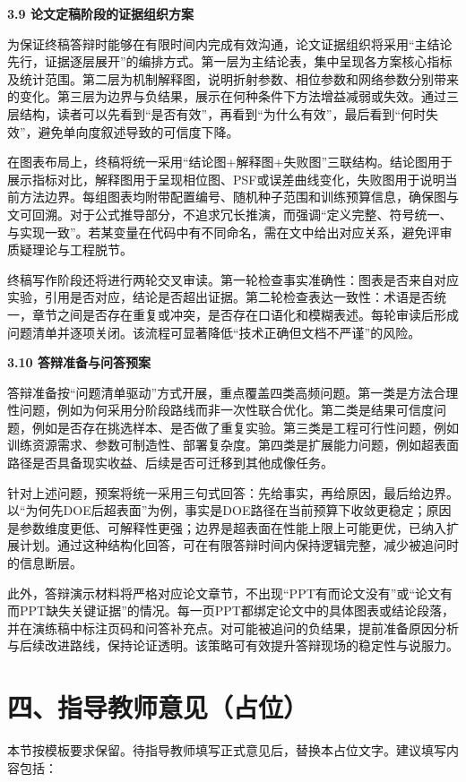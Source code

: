 \documentclass[UTF8,12pt,fontset=fandol]{ctexart}
\newcommand{\hfirst}[1]{%
\vspace{0.6em}
\noindent\textbf{#1}\par
}
\begin{document}
\hfirst{3.9 论文定稿阶段的证据组织方案}
为保证终稿答辩时能够在有限时间内完成有效沟通，论文证据组织将采用“主结论先行，证据逐层展开”的编排方式。第一层为主结论表，集中呈现各方案核心指标及统计范围。第二层为机制解释图，说明折射参数、相位参数和网络参数分别带来的变化。第三层为边界与负结果，展示在何种条件下方法增益减弱或失效。通过三层结构，读者可以先看到“是否有效”，再看到“为什么有效”，最后看到“何时失效”，避免单向度叙述导致的可信度下降。

在图表布局上，终稿将统一采用“结论图+解释图+失败图”三联结构。结论图用于展示指标对比，解释图用于呈现相位图、PSF或误差曲线变化，失败图用于说明当前方法边界。每组图表均附带配置编号、随机种子范围和训练预算信息，确保图与文可回溯。对于公式推导部分，不追求冗长推演，而强调“定义完整、符号统一、与实现一致”。若某变量在代码中有不同命名，需在文中给出对应关系，避免评审质疑理论与工程脱节。

终稿写作阶段还将进行两轮交叉审读。第一轮检查事实准确性：图表是否来自对应实验，引用是否对应，结论是否超出证据。第二轮检查表达一致性：术语是否统一，章节之间是否存在重复或冲突，是否存在口语化和模糊表述。每轮审读后形成问题清单并逐项关闭。该流程可显著降低“技术正确但文档不严谨”的风险。

\hfirst{3.10 答辩准备与问答预案}
答辩准备按“问题清单驱动”方式开展，重点覆盖四类高频问题。第一类是方法合理性问题，例如为何采用分阶段路线而非一次性联合优化。第二类是结果可信度问题，例如是否存在挑选样本、是否做了重复实验。第三类是工程可行性问题，例如训练资源需求、参数可制造性、部署复杂度。第四类是扩展能力问题，例如超表面路径是否具备现实收益、后续是否可迁移到其他成像任务。

针对上述问题，预案将统一采用三句式回答：先给事实，再给原因，最后给边界。以“为何先DOE后超表面”为例，事实是DOE路径在当前预算下收敛更稳定；原因是参数维度更低、可解释性更强；边界是超表面在性能上限上可能更优，已纳入扩展计划。通过这种结构化回答，可在有限答辩时间内保持逻辑完整，减少被追问时的信息断层。

此外，答辩演示材料将严格对应论文章节，不出现“PPT有而论文没有”或“论文有而PPT缺失关键证据”的情况。每一页PPT都绑定论文中的具体图表或结论段落，并在演练稿中标注页码和问答补充点。对可能被追问的负结果，提前准备原因分析与后续改进路线，保持论证透明。该策略可有效提升答辩现场的稳定性与说服力。

\section*{四、指导教师意见（占位）}
本节按模板要求保留。待指导教师填写正式意见后，替换本占位文字。建议填写内容包括：
\end{document}
